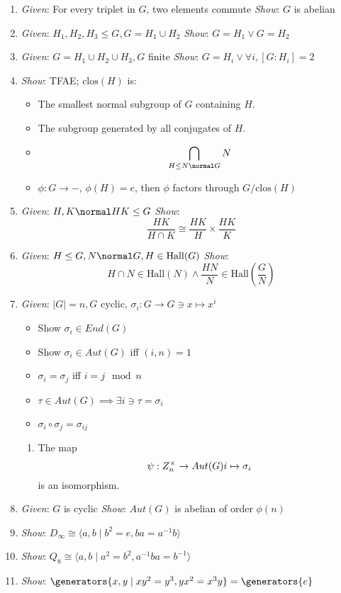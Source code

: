 \begin{enumerate}
\def\labelenumi{\arabic{enumi}.}
\item
  \emph{Given}: For every triplet in $G$, two elements commute
  \emph{Show}: $G$ is abelian
\item
  \emph{Given}: $H_1, H_2, H_3 \leq G, G = H_1 \cup H_2$ \emph{Show}:
  $G=H_1 \vee G=H_2$
\item
  \emph{Given}: $G=H_1 \cup H_2 \cup H_3, G$ finite \emph{Show}:
  $G=H_i \vee \forall i, [G:H_i] = 2$
\item
  \emph{Show}: TFAE; $\text{clos}(H)$ is:

  \begin{itemize}
  \tightlist
  \item
    The smallest normal subgroup of $G$ containing $H$.
  \item
    The subgroup generated by all conjugates of $H$.
  \item
    $$\bigcap_{H \leq N \normal G} N$$
  \item
    $\phi: G \rightarrow -$, $\phi(H) = e$, then $\phi$ factors through
    $G/\text{clos}(H)$
  \end{itemize}
\item
  \emph{Given}: $H, K \normal HK \leq G$ \emph{Show}:
  $$ \frac{HK}{H\cap K} \cong \frac{HK}{H}\times \frac{HK}{K}$$
\item
  \emph{Given}: $H\leq G, N \normal G, H \in \text{Hall}(G)$
  \emph{Show}:
  $$H\cap N \in \text{Hall}(N) \wedge \frac{HN}{N} \in \text{Hall}(\frac{G}{N})$$
\item
  \emph{Given}: $|G| = n, G$ cyclic,
  $\sigma_i: G \rightarrow G \ni x \mapsto x^i$

  \begin{itemize}
  \tightlist
  \item
    Show $\sigma_i \in End(G)$
  \item
    Show $\sigma_i \in Aut(G)$ iff $(i, n) = 1$
  \item
    $\sigma_i = \sigma_j$ iff $i=j\mod n$
  \item
    $\tau \in Aut(G) \implies \exists i \ni \tau = \sigma_i$
  \item
    $\sigma_i \circ \sigma_j = \sigma_{ij}$
  \end{itemize}

  \begin{enumerate}
  \def\labelenumii{\arabic{enumii}.}
  \setcounter{enumii}{5}
  \tightlist
  \item
    The map $$\psi: Z_n^\times \rightarrow Aut(G)\\ i \mapsto \sigma_i$$
    is an isomorphism.
  \end{enumerate}
\item
  \emph{Given}: $G$ is cyclic \emph{Show}: $Aut(G)$ is abelian of order
  $\phi(n)$
\item
  \emph{Show}:
  $D_\infty \cong \langle a,b \mid b^2 = e, ba = a^{-1} b \rangle$
\item
  \emph{Show}:
  $Q_8 \cong \langle a,b \mid a^2 = b^2, a^{-1}ba = b^{-1}\rangle$
\item
  \emph{Show}:
  $\generators{x,y \mid xy^2 = y^3, yx^2 = x^3y} = \generators{e}$
\end{enumerate}

